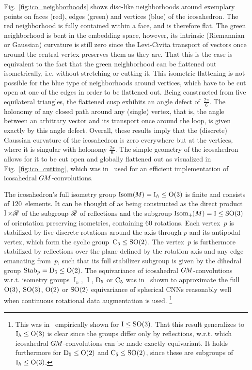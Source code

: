 Fig.~\ref{fig:ico_neighborhoods} shows disc-like neighborhoods around exemplary points on faces (red), edges (green) and vertices (blue) of the icosahedron.
The red neighborhood is fully contained within a face, and is therefore flat.
The green neighborhood is bent in the embedding space, however, its intrinsic (Riemannian or Gaussian) curvature is still zero since the Levi-Civita transport of vectors once around the central vertex preserves them as they are.
That this is the case is equivalent to the fact that the green neighborhood can be flattened out isometrically, i.e. without stretching or cutting it.
This isometric flattening is not possible for the blue type of neighborhoods around vertices, which have to be cut open at one of the edges in order to be flattened out.
Being constructed from five equilateral triangles, the flattened cusp exhibits an angle defect of~$\frac{2\pi}{6}$.
The holonomy of any closed path around any (single) vertex, that is, the angle between an arbitrary vector and its transport once around the loop, is given exactly by this angle defect.
Overall, these results imply that the (discrete) Gaussian curvature of the icosahedron is zero everywhere but at the vertices, where it is singular with holonomy $\frac{2\pi}{6}$.
The simple geometry of the icosahedron allows for it to be cut open and globally flattened out as visualized in Fig.~\ref{fig:ico_cutting}, which was in~\cite{liu2018icoAltAz,gaugeIco2019,zhang2019orientation} used for an efficient implementation of icosahedral $G\mkern-1.4muM$-convolutions.


The icosahedron's full isometry group $\operatorname{Isom}(\mkern-1.5mu M \mkern-.5mu) = \operatorname{I}_h \leq \operatorname{O}(3)$ is finite and consists of 120~elements.
It can be thought of as being constructed as the direct product $\operatorname{I} \times \mathscr{R}$ of the subgroup $\mathscr{R}$ of reflections and the subgroup $\operatorname{Isom}_+\mkern-2mu(M) = \operatorname{I} \leq \operatorname{SO}(3)$ of orientation preserving isometries, containing 60 rotations.
Each vertex~$p$ is stabilized by five discrete rotations around the axis through $p$ and its antipodal vertex, which form the cyclic group~$\operatorname{C}_{5} \leq \operatorname{SO}(2)$.
The vertex~$p$ is furthermore stabilized by reflections over the plane defined by the rotation axis and any edge emanating from~$p$, such that its full stabilizer subgroup is given by the dihedral group $\operatorname{Stab}_{p} = \operatorname{D}_{5} \leq \operatorname{O}(2)$.
The equivariance of icosahedral $G\mkern-1.4muM$-convolutions w.r.t. isometry groups $\operatorname{I}_h$, $\operatorname{I}$, $\operatorname{D}_{5}$ or $\operatorname{C}_{5}$ was in~\cite{gaugeIco2019} shown to approximate the full $\operatorname{O}(3)$, $\operatorname{SO}(3)$, $\operatorname{O}(2)$ or $\operatorname{SO}(2)$ equivariance of spherical CNNs reasonably well when continuous rotational data augmentation is used.%
\footnote{
    This was in~\cite{gaugeIco2019} empirically shown for $\operatorname{I} \leq \operatorname{SO}(3)$.
    That this result generalizes to $\operatorname{I}_h \leq \operatorname{O}(3)$ is clear since the groups differ only by reflections, w.r.t. which icosahedral $G\mkern-1.4muM$-convolutions can be made exactly equivariant.
    It holds furthermore for $\operatorname{D}_{5} \leq \operatorname{O}(2)$ and $\operatorname{C}_{5} \leq \operatorname{SO}(2)$, since these are subgroups of $\operatorname{I}_h \leq \operatorname{O}(3)$.
}


